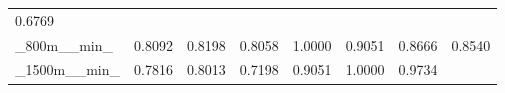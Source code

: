 \documentclass[11pt]{article}
\begin{document}
\begin{longtable}[]{@{}llllllll@{}}
\begin{minipage}[t]{0.10\columnwidth}
0.6769\strut
\end{minipage}\tabularnewline
\begin{minipage}[t]{0.10\columnwidth}\raggedright
\_800m\_\_min\_\strut
\end{minipage} & \begin{minipage}[t]{0.10\columnwidth}\raggedright
0.8092\strut
\end{minipage} & \begin{minipage}[t]{0.10\columnwidth}\raggedright
0.8198\strut
\end{minipage} & \begin{minipage}[t]{0.10\columnwidth}\raggedright
0.8058\strut
\end{minipage} & \begin{minipage}[t]{0.10\columnwidth}\raggedright
1.0000\strut
\end{minipage} & \begin{minipage}[t]{0.10\columnwidth}\raggedright
0.9051\strut
\end{minipage} & \begin{minipage}[t]{0.10\columnwidth}\raggedright
0.8666\strut
\end{minipage} & \begin{minipage}[t]{0.10\columnwidth}\raggedright
0.8540\strut
\end{minipage}\tabularnewline
\begin{minipage}[t]{0.10\columnwidth}\raggedright
\_1500m\_\_min\_\strut
\end{minipage} & \begin{minipage}[t]{0.10\columnwidth}\raggedright
0.7816\strut
\end{minipage} & \begin{minipage}[t]{0.10\columnwidth}\raggedright
0.8013\strut
\end{minipage} & \begin{minipage}[t]{0.10\columnwidth}\raggedright
0.7198\strut
\end{minipage} & \begin{minipage}[t]{0.10\columnwidth}\raggedright
0.9051\strut
\end{minipage} & \begin{minipage}[t]{0.10\columnwidth}\raggedright
1.0000\strut
\end{minipage} & \begin{minipage}[t]{0.10\columnwidth}\raggedright
0.9734\strut
\end{minipage} & \begin{minipage}[t]{0.10\columnwidth}\raggedright

\end{minipage}
\end{longtable}
\end{document}
